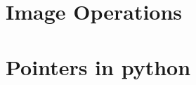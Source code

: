 \documentclass[addpoints]{exam}
\begin{document}
  \appendix
  \section{}
  

  \newpage
  \section{}
  

  \newpage
  \section{Image Operations}
  

  \newpage
  \section{Pointers in python}
  
\end{document}

